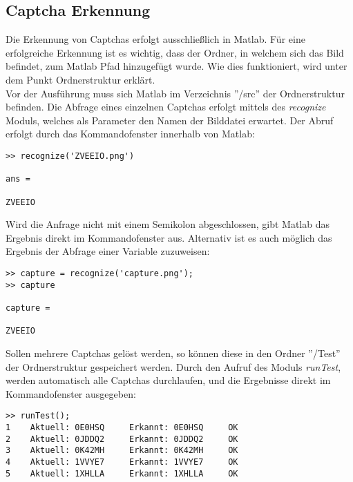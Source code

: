\subsection{Captcha Erkennung}
Die Erkennung von Captchas erfolgt ausschließlich in Matlab. Für eine erfolgreiche Erkennung ist es wichtig, dass der Ordner, in welchem sich das Bild befindet, zum Matlab Pfad hinzugefügt wurde. Wie dies funktioniert, wird unter dem Punkt Ordnerstruktur erklärt.\\
Vor der Ausführung muss sich Matlab im Verzeichnis ''/src'' der Ordnerstruktur befinden. Die Abfrage eines einzelnen Captchas erfolgt mittels des \textit{recognize} Moduls, welches als Parameter den Namen der Bilddatei erwartet. Der Abruf erfolgt durch das Kommandofenster innerhalb von Matlab:
\begin{verbatim}
>> recognize('ZVEEIO.png')

ans =

ZVEEIO
\end{verbatim} 
Wird die Anfrage nicht mit einem Semikolon abgeschlossen, gibt Matlab das Ergebnis direkt im Kommandofenster aus. Alternativ ist es auch möglich das Ergebnis der Abfrage einer Variable zuzuweisen:
\begin{verbatim}
>> capture = recognize('capture.png');
>> capture

capture =

ZVEEIO
\end{verbatim} 
$\;$ \\
Sollen mehrere Captchas gelöst werden, so können diese in den Ordner ''/Test'' der Ordnerstruktur gespeichert werden. Durch den Aufruf des Moduls \textit{runTest}, werden automatisch alle Captchas durchlaufen, und die Ergebnisse direkt im Kommandofenster ausgegeben:
\begin{verbatim}
>> runTest();
1	 Aktuell: 0E0HSQ	 Erkannt: 0E0HSQ	 OK
2	 Aktuell: 0JDDQ2	 Erkannt: 0JDDQ2	 OK
3	 Aktuell: 0K42MH	 Erkannt: 0K42MH	 OK
4	 Aktuell: 1VVYE7	 Erkannt: 1VVYE7	 OK
5	 Aktuell: 1XHLLA	 Erkannt: 1XHLLA	 OK
\end{verbatim} 